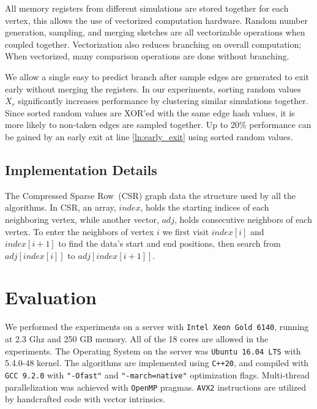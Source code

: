 \documentclass[10pt,journal,compsoc]{IEEEtran}
\begin{document}
 All memory registers from different simulations are stored together for each vertex, this allows the use of vectorized computation hardware. Random number generation, sampling, and merging sketches are all vectorizable operations when coupled together. Vectorization also reduces branching on overall computation; When vectorized, many comparison operations are done without branching. 

We allow a single easy to predict branch after sample edges are generated to exit early without merging the registers. In our experiments, sorting random values $X_r$ significantly increases performance by clustering similar simulations together. Since sorted random values are XOR'ed with the same edge hash values, it is more likely to non-taken edges are sampled together. Up to 20\% performance can be gained by an early exit at line \ref{ln:early_exit} using sorted random values.

\subsection{Implementation Details}
The Compressed Sparse Row~(CSR) graph data the structure used by all the algorithms. 
In CSR, an array, $index$, holds the starting indices of each neighboring vertex, while another vector, $adj$, holds consecutive neighbors of each vertex. 
To enter the neighbors of vertex $i$ we first visit $index[i]$ and $index[i+1]$ 
to find the data's start and end positions, then search from $adj[index[i]]$ to $adj[index[i+1]]$. 
    
\section{Evaluation}\label{sec:evaluation}
We performed the experiments on a server with {\tt Intel Xeon Gold 6140}, running at 2.3 Ghz and 250 GB memory. All of the 18 cores are allowed in the experiments. The Operating System on the server was {\tt Ubuntu 16.04 LTS} with 5.4.0-48 kernel. The algorithms are implemented using {\tt C++20}, and compiled with {\tt GCC 9.2.0} with {\tt "-Ofast"} and {\tt "-march=native"} optimization flags. Multi-thread parallelization was achieved with {\tt OpenMP} pragmas. {\tt AVX2} instructions are utilized by handcrafted code with vector intrinsics.
\end{document}
